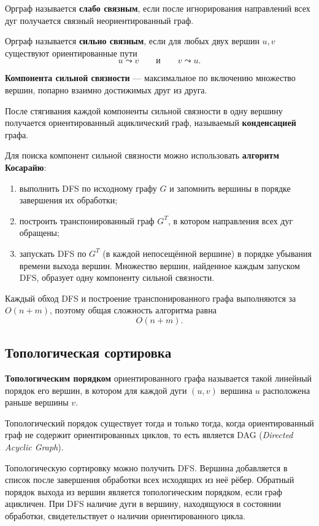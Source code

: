 Орграф называется \textbf{слабо связным}, если после игнорирования направлений всех дуг получается связный неориентированный граф.

Орграф называется \textbf{сильно связным}, если для любых двух вершин $u,v$ существуют ориентированные пути
\[
u\leadsto v
\qquad\text{и}\qquad
v\leadsto u.
\]

\textbf{Компонента сильной связности} --- максимальное по включению множество вершин, попарно взаимно достижимых друг из друга.

После стягивания каждой компоненты сильной связности в одну вершину получается ориентированный ациклический граф, называемый \textbf{конденсацией} графа.

Для поиска компонент сильной связности можно использовать \textbf{алгоритм Косарайю}:
\begin{enumerate}
	\item выполнить DFS по исходному графу $G$ и запомнить вершины в порядке завершения их обработки;
	\item построить транспонированный граф $G^T$, в котором направления всех дуг обращены;
	\item запускать DFS по $G^T$ (в каждой непосещённой вершине) в порядке убывания времени выхода вершин. Множество вершин, найденное каждым запуском DFS, образует одну компоненту сильной связности.
\end{enumerate}

Каждый обход DFS и построение транспонированного графа выполняются за $O(n+m)$, поэтому общая сложность алгоритма равна 
\[
O(n+m).
\]

\subsection{Топологическая сортировка}

\textbf{Топологическим порядком} ориентированного графа называется такой линейный порядок его вершин, в котором для каждой дуги $(u,v)$ вершина $u$ расположена раньше вершины $v$.

Топологический порядок существует тогда и только тогда, когда ориентированный граф не содержит ориентированных циклов, то есть является DAG (\textit{Directed Acyclic Graph}).

Топологическую сортировку можно получить DFS. Вершина добавляется в список после завершения обработки всех исходящих из неё рёбер. Обратный порядок выхода из вершин является топологическим порядком, если граф ацикличен. При DFS наличие дуги в вершину, находящуюся в состоянии обработки, свидетельствует о наличии ориентированного цикла.

